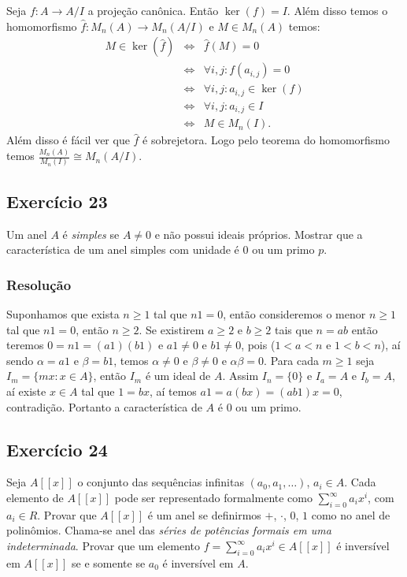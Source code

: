 \documentclass[10pt,a4paper]{article}
\begin{document}
\noindent
Seja $f:A\rightarrow A/I$ a projeção canônica. Então $\ker(f)=I$. Além disso temos o homomorfismo $\hat{f}:M_n(A)\rightarrow M_n(A/I)$ e $M\in M_n(A)$ temos:
\[
\begin{array}{rcl}
M\in\ker(\hat{f})&\Leftrightarrow&\hat{f}(M)=0\\&\Leftrightarrow&\forall i,j:f(a_{i,j})=0\\&\Leftrightarrow&\forall i,j:a_{i,j}\in\ker(f)\\&\Leftrightarrow&\forall i,j:a_{i,j}\in I\\&\Leftrightarrow&M\in M_n(I).
\end{array}
\]
Além disso é fácil ver que $\hat{f}$ é sobrejetora. Logo pelo teorema do homomorfismo temos $\frac{M_n(A)}{M_n(I)}\cong M_n(A/I)$.

\newpage

\subsection*{Exercício 23}
Um anel $A$ é \textit{simples} se $A\neq 0$ e não possui ideais próprios. Mostrar que a característica de um anel simples com unidade é $0$ ou um primo $p$.

\subsubsection*{Resolução}

Suponhamos que exista $n\geq 1$ tal que $n1=0$, então consideremos o menor $n\geq 1$ tal que $n1=0$, então $n\geq 2$. Se existirem $a\geq 2$ e $b\geq 2$ tais que $n=ab$ então teremos $0=n1=(a1)(b1)$ e $a1\neq 0$ e $b1\neq 0$, pois ($1<a<n$ e $1<b<n$), aí sendo $\alpha=a1$ e $\beta=b1$, temos $\alpha\neq 0$ e $\beta\neq 0$ e $\alpha\beta=0$. Para cada $m\geq 1$ seja $I_m=\{mx:x\in A\}$, então $I_m$ é um ideal de $A$. Assim $I_n=\{0\}$ e $I_a=A$ e $I_b=A$, aí existe $x\in A$ tal que $1=bx$, aí temos $a1=a(bx)=(ab1)x=0$, contradição. Portanto a característica de $A$ é $0$ ou um primo.

\subsection*{Exercício 24}
Seja $A[[x]]$ o conjunto das sequências infinitas $(a_0,a_1,\dots)$, $a_i\in A$. Cada elemento de $A[[x]]$ pode ser representado formalmente como $\sum_{i=0}^\infty a_ix^i$, com $a_i\in R$. Provar que $A[[x]]$ é um anel se definirmos $+$, $\cdot$, $0$, $1$ como no anel de polinômios. Chama-se anel das \textit{séries de potências formais em uma indeterminada}. Provar que um elemento $f=\sum_{i=0}^\infty a_ix^i\in A[[x]]$ é inversível em $A[[x]]$ se e somente se $a_0$ é inversível em $A$.
\end{document}
